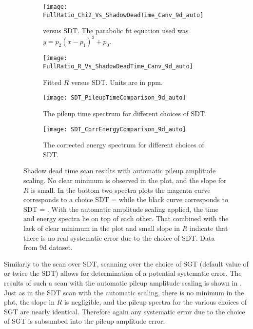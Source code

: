 \begin{figure}[]
\centering
    \begin{subfigure}[]{0.45\textwidth}
        \centering
        \texttt{[image: FullRatio\_Chi2\_Vs\_ShadowDeadTime\_Canv\_9d\_auto]}
        \caption{\chisq versus SDT. The parabolic fit equation used was $y = p_{2}(x - p_{1})^{2} + p_{0}.$}
    \end{subfigure}%
    \hspace{1cm}
    \begin{subfigure}[]{0.45\textwidth}
        \centering
        \texttt{[image: FullRatio\_R\_Vs\_ShadowDeadTime\_Canv\_9d\_auto]}
        \caption{Fitted $R$ versus SDT. Units are in ppm.}
    \end{subfigure}

    \begin{subfigure}[]{0.45\textwidth}
        \centering
        \texttt{[image: SDT\_PileupTimeComparison\_9d\_auto]}
        \caption{The pileup time spectrum for different choices of SDT.}
    \end{subfigure}%
    \hspace{1cm}
    \begin{subfigure}[]{0.45\textwidth}
        \centering
        \texttt{[image: SDT\_CorrEnergyComparison\_9d\_auto]}
        \caption{The corrected energy spectrum for different choices of SDT.}
    \end{subfigure}
\caption[Pileup shadow dead time scan with automatic pileup amplitude scaling]{Shadow dead time scan results with automatic pileup amplitude scaling. No clear minimum is observed in the \chisq plot, and the slope for $R$ is small. In the bottom two spectra plots the magenta curve corresponds to a choice SDT =  while the black curve corresponds to SDT = . With the automatic amplitude scaling applied, the time and energy spectra lie on top of each other. That combined with the lack of clear minimum in the \chisq plot and small slope in $R$ indicate that there is no real systematic error due to the choice of SDT. Data from 9d dataset.}
\label{fig:SDTscan_autoScaling}
\end{figure}


Similarly to the scan over SDT, scanning over the choice of SGT (default value of  or twice the SDT) allows for determination of a potential systematic error. The results of such a scan with the automatic pileup amplitude scaling is shown in . Just as in the SDT scan with the automatic scaling, there is no minimum in the \chisq plot, the slope in $R$ is negligible, and the pileup spectra for the various choices of SGT are nearly identical. Therefore again any systematic error due to the choice of SGT is subsumbed into the pileup amplitude error.


